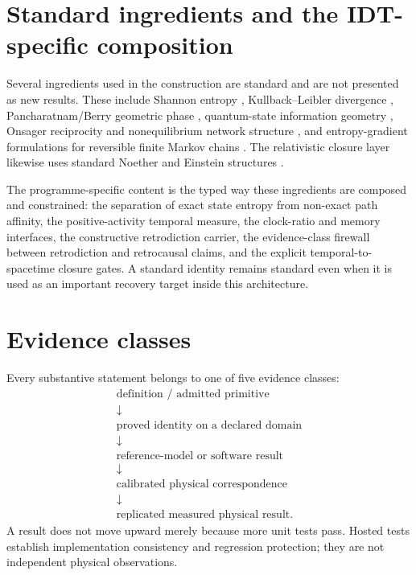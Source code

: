 \section*{Standard ingredients and the IDT-specific composition}

Several ingredients used in the construction are standard and are not presented as new results. These include Shannon entropy \cite{Shannon1948}, Kullback--Leibler divergence \cite{KullbackLeibler1951}, Pancharatnam/Berry geometric phase \cite{Pancharatnam1956,Berry1984}, quantum-state information geometry \cite{ProvostVallee1980}, Onsager reciprocity and nonequilibrium network structure \cite{Onsager1931,Schnakenberg1976}, and entropy-gradient formulations for reversible finite Markov chains \cite{Maas2011}. The relativistic closure layer likewise uses standard Noether and Einstein structures \cite{Noether1971,Einstein1916}.

The programme-specific content is the typed way these ingredients are composed and constrained: the separation of exact state entropy from non-exact path affinity, the positive-activity temporal measure, the clock-ratio and memory interfaces, the constructive retrodiction carrier, the evidence-class firewall between retrodiction and retrocausal claims, and the explicit temporal-to-spacetime closure gates. A standard identity remains standard even when it is used as an important recovery target inside this architecture.

\section*{Evidence classes}

Every substantive statement belongs to one of five evidence classes:
\[
\boxed{
\begin{array}{c}
\text{definition / admitted primitive}\\
\downarrow\\
\text{proved identity on a declared domain}\\
\downarrow\\
\text{reference-model or software result}\\
\downarrow\\
\text{calibrated physical correspondence}\\
\downarrow\\
\text{replicated measured physical result}.
\end{array}}
\]
A result does not move upward merely because more unit tests pass. Hosted tests establish implementation consistency and regression protection; they are not independent physical observations.

